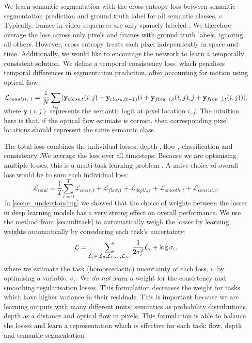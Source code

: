 We learn semantic segmentation with the cross entropy loss between semantic segmentation prediction and ground truth label for all semantic classes, $c$.
Typically, frames in video sequences are only sparsely labeled \citep{Cordts2016Cityscapes}. We therefore average the loss across only pixels and frames with ground truth labels, ignoring all others.
However, cross entropy treats each pixel independently in space and time. Additionally, we would like to encourage the network to learn a temporally consistent solution. We define a temporal consistency loss, which penalises temporal differences in segmentation prediction, after accounting for motion using optical flow:
\begin{multline}
\vspace{-1mm}
\mathcal{L}_{consist,~t} = \frac{1}{N} \sum_{i,j} | \mathbf{y}_{class,t}(i,j) - \mathbf{y}_{class,(t-1)}(i+\mathbf{y}_{flow~i,t}(i,j),j+\mathbf{y}_{flow~j,t}(i,j)) |,
\label{eqn:consistency}
\vspace{-3mm}
\end{multline}
where $\mathbf{y}(i,j)$ represents the semantic logit at pixel location $i,j$. The intuition here is that, if the optical flow estimate is correct, then corresponding pixel locations should represent the same semantic class.

The total loss combines the individual losses: depth , flow , classification and consistency .We average the loss over all timesteps. Because we are optimising multiple losses, this is a multi-task learning problem \citep{caruana1998multitask}. A naive choice of overall loss would be to sum each individual loss:
\begin{equation}
\mathcal{L}_{total} =\frac{1}{T} \sum_{t=0}^T  \mathcal{L}_{class,t} +\mathcal{L}_{flow,t} +\mathcal{L}_{depth,t} +\mathcal{L}_{smooth,t} +\mathcal{L}_{consist,t} .
\end{equation}
In \cref{scene_understanding} we showed that the choice of weights between the losses in deep learning models has a very strong effect on overall performance. We use the method from \cref{sec:mlttask} to automatically weigh the losses by learning weights automatically by considering each task's uncertainty:
\begin{equation}
\vspace{-1mm}
\mathcal{L} = \sum_{\mathcal{L}_i \in [\mathcal{L}_{0}, \mathcal{L}_{1}, ..., \mathcal{L}_{N}]} \frac{1}{2 \sigma_i^2} \mathcal{L}_i + \log \sigma_i,
\label{eqn:multitask}
\vspace{-1mm}
\end{equation}
where we estimate the task (homoscedastic) uncertainty of each loss, $i$, by optimising a variable, $\sigma_i$. We \textit{do not} learn a weight for the consistency and smoothing regularisation losses. This formulation decreases the weight for tasks which have higher variance in their residuals. This is important because we are learning outputs with many different units: semantics as probability distributions, depth as a distance and optical flow in pixels. This formulation is able to balance the losses and learn a representation which is effective for each task: flow, depth and semantic segmentation.



